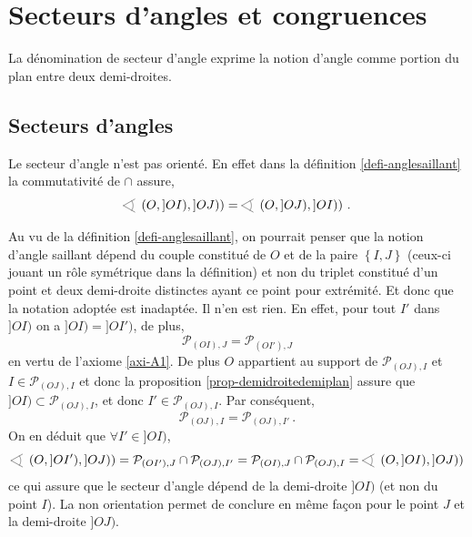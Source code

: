     \section{Secteurs d'angles et congruences}\label{subsec_secang}

La dénomination de secteur d'angle exprime la notion d'angle comme portion du plan entre deux demi-droites. 
        
        \subsection{Secteurs d'angles}

\begin{rema}
    Le secteur d'angle n'est pas orienté. En effet dans la définition \ref{defi-anglesaillant} la commutativité de $\cap$ assure,
    \begin{equation*}
       \anglesaillant \left({O},{]OI)},{]OJ)}\right) = \anglesaillant \left({O},{]OJ)},{]OI)}\right)\,.
    \end{equation*}  
\end{rema}

\begin{rema}
    Au vu de la définition \ref{defi-anglesaillant}, on pourrait penser que la notion d'angle saillant dépend du couple constitué de $O$ et de la paire $\left\{I,J\right\}$ (ceux-ci jouant un rôle symétrique dans la définition) et non du triplet constitué d'un point et deux demi-droite distinctes ayant ce point pour extrémité. Et donc que la notation adoptée est inadaptée. Il n'en est rien. En effet, pour tout $I'$ dans $]OI)$ on a $]OI)=]OI')$, de plus,
    $$\mathcal{P}_{(OI),J} = \mathcal{P}_{(OI'),J}$$
    en vertu de l'axiome \ref{axi-A1}. De plus $O$ appartient au support de $\mathcal{P}_{(OJ),I}$ et $I\in \mathcal{P}_{(OJ),I}$ et donc la proposition \ref{prop-demidroitedemiplan} assure que $]OI)\subset \mathcal{P}_{(OJ),I}$, et donc $I'\in \mathcal{P}_{(OJ),I}$. Par conséquent, $$\mathcal{P}_{(OJ),I}=\mathcal{P}_{(OJ),I'}\,.$$ On en déduit que $\forall I'\in ]OI)$,
    \begin{equation*}
        \anglesaillant \left({O},{]OI')},{]OJ)}\right) = \mathcal{P}_{(OI'),J}\cap\mathcal{P}_{(OJ),I'}= \mathcal{P}_{(OI),J}\cap\mathcal{P}_{(OJ),I}=\anglesaillant \left({O},{]OI)},{]OJ)}\right)
    \end{equation*}
    ce qui assure que le secteur d'angle dépend de la demi-droite $]OI)$ (et non du point $I$). La non orientation permet de conclure en même façon pour le point $J$ et la demi-droite $]OJ)$. 
\end{rema}

